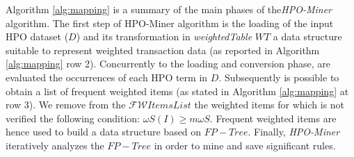 \documentclass{article}
\theoremstyle{definition}
\begin{document}
Algorithm \ref{alg:mapping} is a summary of the main phases of the\textit{HPO-Miner} algorithm.
The first step of HPO-Miner algorithm is the loading of the input HPO dataset ($D$) and its transformation in \textit{weightedTable} $WT$ a data structure suitable to represent weighted transaction data (as reported in Algorithm \ref{alg:mapping} row 2). Concurrently to the loading and conversion phase, are evaluated the occurrences of each HPO term in $D$. Subsequently is possible to obtain a list of frequent weighted items (as stated in Algorithm \ref{alg:mapping} at row 3). We remove from the $\mathcal{FW}ItemsList$ the weighted items for which is not verified the following condition: $\omega S(I) \geq m\omega S$. Frequent weighted items are hence used to build a data structure based on  $FP-Tree$.  Finally, \textit{HPO-Miner} iteratively analyzes the $FP-Tree$ in order to mine and save significant rules. 
\end{document}
